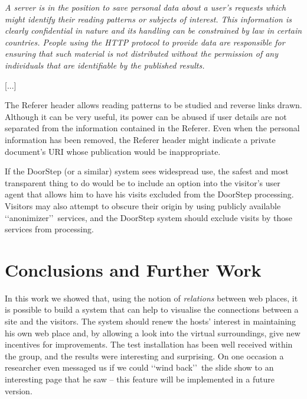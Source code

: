 \documentclass[a4paper,twoside]{danarticle}
\theoremstyle{remark}
\begin{document}
    \begin{center}
       \begin{minipage}{10cm}
       \itshape
          A server is in the position to save personal data about a user's
          requests which might identify their reading patterns or subjects of
          interest. This information is clearly confidential in nature and its
          handling can be constrained by law in certain countries. People using
          the HTTP protocol to provide data are responsible for ensuring that
          such material is not distributed without the permission of any
          individuals that are identifiable by the published results.
   
          [...]
   
          The Referer header allows reading patterns to be studied and reverse
          links drawn. Although it can be very useful, its power can be abused
          if user details are not separated from the information contained in
          the Referer. Even when the personal information has been removed, the
          Referer header might indicate a private document's URI whose
          publication would be inappropriate.
       \end{minipage}
    \end{center}
    
    If the DoorStep (or a similar) system sees widespread use, the safest and 
    most transparent thing to do would be to include an option into the
    visitor's user agent that allows him to have his visits excluded from the
    DoorStep processing. Visitors may also attempt to obscure their origin by
    using publicly available \lq\lq anonimizer\rq\rq\ services, and the DoorStep
    system should exclude visits by those services from processing.
  \section{Conclusions and Further Work} In this work we showed that, using 
    the notion of \textit{relations} between web places, it is possible to build 
    a system that can help to visualise the connections between a site and the 
    visitors. The system should renew the hosts' interest in maintaining his own 
    web place and, by allowing a look into the virtual surroundings, give new 
    incentives for improvements. The test installation has been well received 
    within the group, and the results were interesting and surprising. On one 
    occasion a researcher even messaged us if we could \lq\lq wind back\rq\rq\ 
    the slide show to an interesting page that he saw -- this feature will be 
    implemented in a future version.
    
\end{document}
